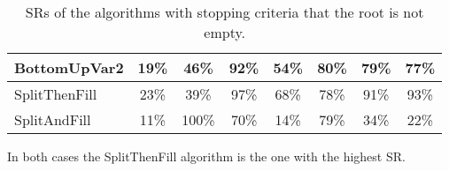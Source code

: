 \begin{table}[h]
\begin{tabular}{|l|c|c|c|c|c|c|c|}
		BottomUpVar2                    &19\%      &46\%                                                           &92\%                                                              &54\%      &80\%                                                        &79\%                                                         &77\%                                                           \\ \hline
		SplitThenFill                   &23\%    &39\%                                                           &97\%                                                              &68\%      &78\%                                                        &91\%                                                         &93\%                                                           \\ \hline
		SplitAndFill                    &11\%      &100\%                                                           &70\%                                                              &14\%      &79\%                                                        &34\%                                                         &22\%                                                           \\ \hline
	\end{tabular}
	\caption{SRs of the algorithms with stopping criteria that the root is not empty.}
	\label{ComparisionRootNotEmpty}
\end{table}
In both cases the SplitThenFill algorithm is the one with the highest SR.
\pagebreak
